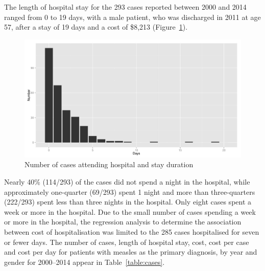 \documentclass{article}
\begin{document}
The length of hospital stay for the 293 cases reported between 2000 and 2014 ranged from 0 to 19 days, with a male patient, who was discharged in 2011 at age 57, after a stay of 19 days and a cost of \$8,213 (Figure~\ref{fig:hosp}).


\begin{figure}[h!]
\begin{center}
\includegraphics{interimreport2-039}
\end{center}
\caption{Number of cases attending hospital and stay duration}
\label{fig:hosp}
\end{figure}

Nearly 40\% (114/293) of the cases did not spend a night in the hospital, while approximately one-quarter (69/293) spent 1 night and more than three-quarters (222/293) spent less than three nights in the hospital. Only eight cases spent a week or more in the hospital. Due to the small number of cases spending a week or more in the hospital, the regression analysis to determine the association between cost of hospitalisation was limited to the 285 cases hospitalised for seven or fewer days. The number of cases, length of hospital stay, cost, cost per case and cost per day for patients with measles as the primary diagnosis, by year and gender for 2000--2014 appear in Table~\ref{table:cases}.
\end{document}
